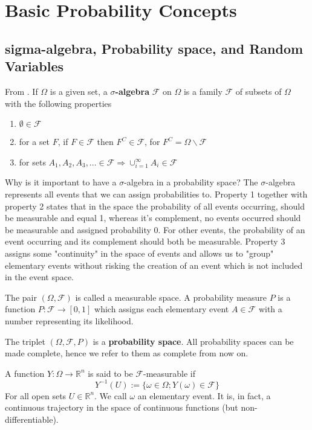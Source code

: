 \documentclass[12pt]{book}
\begin{document}
\tableofcontents
\chapter{Basic Probability Concepts}
\section{sigma-algebra, Probability space, and Random Variables}
From \cite{Oksendal14}. If $\Omega$ is a given set, a \textbf{$\sigma$-algebra} $\mathcal{F}$ on $\Omega$ is a family $\mathcal{F}$ of subsets of $\Omega$ with the following properties
\begin{enumerate}
\item $\emptyset \in \mathcal{F}$
\item for a set $F$, if $F\in \mathcal{F}$ then $F^C\in\mathcal{F}$, for $F^C= \Omega\backslash\mathcal{F}$
\item for sets $A_1,A_2,A_3,...\in\mathcal{F}\Rightarrow \cup_{i=1}^\infty A_i \in \mathcal{F}$
\end{enumerate}
Why is it important to have a $\sigma$-algebra in a probability space?
The $\sigma$-algebra represents all events that we can assign probabilities to. Property 1 together with property 2 states that in the space the probability of all events occurring, should be measurable and equal 1, whereas it's complement, no events occurred should be measurable and assigned probability 0. For other events, the probability of an event occurring and its complement should both be measurable. Property 3 assigns some "continuity" in the space of events and allows us to "group" elementary events without risking the creation of an event which is not included in the event space. 

The pair $(\Omega,\mathcal{F})$ is called a measurable space. A probability measure $P$ is a function $P:\mathcal{F}\rightarrow [0,1]$ which assigns each elementary event $A\in\mathcal{F}$ with a number representing its likelihood. 

The triplet $(\Omega,\mathcal{F},P)$ is a \textbf{probability space}. All probability spaces can be made complete, hence we refer to them as complete from now on. 

A function $Y:\Omega\rightarrow\mathbb{R}^n$ is said to be $\mathcal{F}$-measurable if
\begin{equation*}
Y^{-1}(U):=\{\omega\in \Omega ; Y(\omega)\in \mathcal{F}\}
\end{equation*}
For all open sets $U\in\mathbb{R}^n$. We call $\omega$ an elementary event. It is, in fact, a continuous trajectory in the space of continuous functions (but non-differentiable). 
\end{document}
